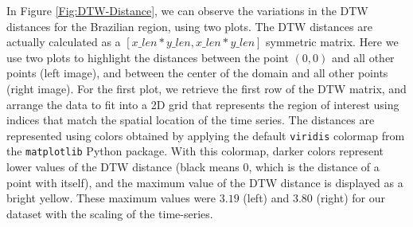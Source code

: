 In Figure \ref{Fig:DTW-Distance}, we can observe the variations in the DTW distances for the Brazilian region, using two plots. The DTW distances are actually calculated as a $[x\_len * y\_len, x\_len * y\_len]$ symmetric matrix. Here we use two plots to highlight the distances between the point $(0, 0)$ and all other points (left image), and between the center of the domain and all other points (right image). For the first plot, we retrieve the first row of the DTW matrix, and arrange the data to fit into a 2D grid that represents the region of interest using indices that match the spatial location of the time series. The distances are represented using colors obtained by applying the default \texttt{viridis} colormap from the \texttt{matplotlib} Python package. With this colormap, darker colors represent lower values of the DTW distance (black means 0, which is the distance of a point with itself), and the maximum value of the DTW distance is displayed as a bright yellow. These maximum values were $3.19$ (left) and $3.80$ (right) for our dataset with the scaling of the time-series.


